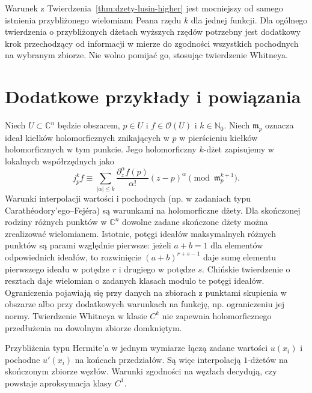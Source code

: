 \begin{uwaga}
Warunek z Twierdzenia~\ref{thm:dzety-lusin-higher}
jest mocniejszy od samego istnienia przybliżonego
wielomianu Peana rzędu $k$ dla jednej funkcji.
Dla ogólnego twierdzenia o przybliżonych dżetach
wyższych rzędów potrzebny jest dodatkowy krok
przechodzący od informacji w mierze do zgodności
wszystkich pochodnych na wybranym zbiorze.
Nie wolno pomijać go, stosując twierdzenie Whitneya.
\end{uwaga}

\section{Dodatkowe przykłady i powiązania}
\begin{przyklad}
Niech $U\subset\mathbb C^n$ będzie obszarem,
$p\in U$ i $f\in\mathcal O(U)$ i $k\in\mathbb N_0$.
Niech $\mathfrak m_p$ oznacza ideał kiełków holomorficznych
znikających w $p$ w pierścieniu kiełków holomorficznych
w tym punkcie. Jego holomorficzny
$k$-dżet zapisujemy w lokalnych współrzędnych jako
\[
 j_p^kf\equiv\sum_{|\alpha|\le k}
 \frac{\partial_z^\alpha f(p)}{\alpha!}(z-p)^\alpha
 \pmod{\mathfrak m_p^{k+1}}.
\]
Warunki interpolacji wartości i pochodnych
(np. w zadaniach typu Carathéodory'ego--Fejéra)
są warunkami na holomorficzne dżety.
Dla skończonej rodziny różnych punktów w $\mathbb C^n$
dowolne zadane skończone dżety można zrealizować
wielomianem. Istotnie, potęgi ideałów maksymalnych
różnych punktów są parami względnie pierwsze:
jeżeli $a+b=1$ dla elementów odpowiednich ideałów,
to rozwinięcie $(a+b)^{r+s-1}$ daje sumę elementu
pierwszego ideału w potędze $r$ i drugiego w potędze $s$.
Chińskie twierdzenie o resztach daje wielomian
o zadanych klasach modulo te potęgi ideałów.
Ograniczenia pojawiają się przy danych na zbiorach
z punktami skupienia w obszarze albo przy dodatkowych
warunkach na funkcję, np. ograniczeniu jej normy.
Twierdzenie Whitneya w klasie $C^k$ nie zapewnia
holomorficznego przedłużenia na dowolnym zbiorze domkniętym.
\end{przyklad}

\begin{przyklad}
Przybliżenia typu Hermite'a w jednym wymiarze
łączą zadane wartości $u(x_i)$ i pochodne $u'(x_i)$
na końcach przedziałów. Są więc interpolacją
$1$-dżetów na skończonym zbiorze węzłów.
Warunki zgodności na węzłach decydują,
czy powstaje aproksymacja klasy $C^1$.
\end{przyklad}

